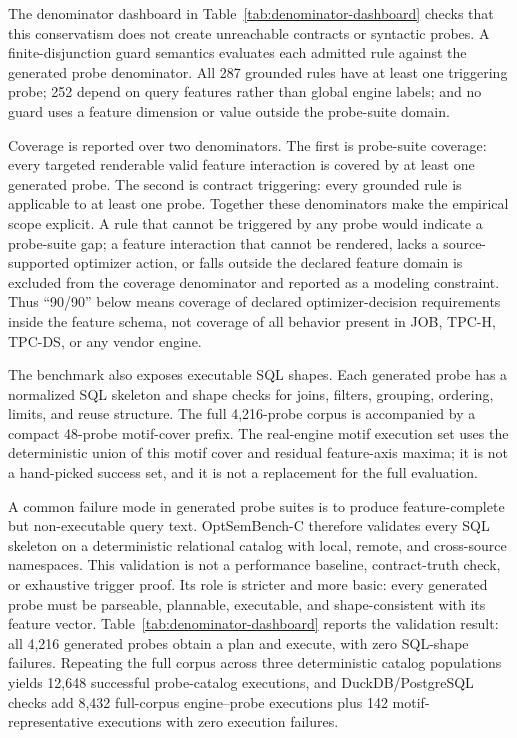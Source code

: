 The denominator dashboard in Table~\ref{tab:denominator-dashboard} checks that this conservatism does not create unreachable contracts or syntactic probes.  A finite-disjunction guard semantics evaluates each admitted rule against the generated probe denominator.  All 287 grounded rules have at least one triggering probe; 252 depend on query features rather than global engine labels; and no guard uses a feature dimension or value outside the probe-suite domain.



Coverage is reported over two denominators.  The first is probe-suite coverage: every targeted renderable valid feature interaction is covered by at least one generated probe.  The second is contract triggering: every grounded rule is applicable to at least one probe.  Together these denominators make the empirical scope explicit.  A rule that cannot be triggered by any probe would indicate a probe-suite gap; a feature interaction that cannot be rendered, lacks a source-supported optimizer action, or falls outside the declared feature domain is excluded from the coverage denominator and reported as a modeling constraint.  Thus ``90/90'' below means coverage of declared optimizer-decision requirements inside the feature schema, not coverage of all behavior present in JOB, TPC-H, TPC-DS, or any vendor engine.

The benchmark also exposes executable SQL shapes.  Each generated probe has a normalized SQL skeleton and shape checks for joins, filters, grouping, ordering, limits, and reuse structure.  The full 4,216-probe corpus is accompanied by a compact 48-probe motif-cover prefix.  The real-engine motif execution set uses the deterministic union of this motif cover and residual feature-axis maxima; it is not a hand-picked success set, and it is not a replacement for the full evaluation.

A common failure mode in generated probe suites is to produce feature-complete but non-executable query text.  OptSemBench-C therefore validates every SQL skeleton on a deterministic relational catalog with local, remote, and cross-source namespaces.  This validation is not a performance baseline, contract-truth check, or exhaustive trigger proof.  Its role is stricter and more basic: every generated probe must be parseable, plannable, executable, and shape-consistent with its feature vector.  Table~\ref{tab:denominator-dashboard} reports the validation result: all 4,216 generated probes obtain a plan and execute, with zero SQL-shape failures.  Repeating the full corpus across three deterministic catalog populations yields 12,648 successful probe-catalog executions, and DuckDB/PostgreSQL checks add 8,432 full-corpus engine--probe executions plus 142 motif-representative executions with zero execution failures.

